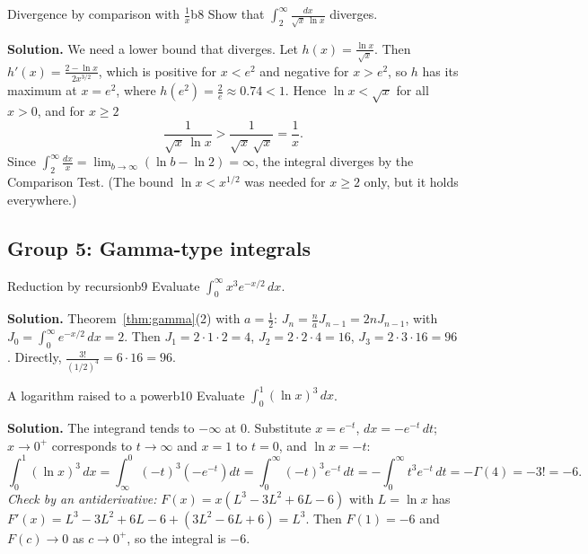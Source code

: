 \documentclass[11pt]{article}
\begin{document}
\begin{exmp}{Divergence by comparison with $\frac1x$}{b8}
Show that $\displaystyle\int_2^\infty\frac{dx}{\sqrt x\,\ln x}$ diverges.

\textbf{Solution.} We need a lower bound that diverges. Let $h(x)=\frac{\ln x}{\sqrt x}$. Then $h'(x)=\frac{2-\ln x}{2x^{3/2}}$, which is positive for $x<e^2$ and negative for $x>e^2$, so $h$ has its maximum at $x=e^2$, where $h(e^2)=\frac2e\approx0.74<1$. Hence $\ln x<\sqrt x$ for all $x>0$, and for $x\ge2$
\[\frac1{\sqrt x\,\ln x}>\frac1{\sqrt x\,\sqrt x}=\frac1x .\]
Since $\int_2^\infty\frac{dx}x=\lim_{b\to\infty}\left(\ln b-\ln2\right)=\infty$, the integral diverges by the Comparison Test. (The bound $\ln x<x^{1/2}$ was needed for $x\ge2$ only, but it holds everywhere.)
\end{exmp}

\subsection*{Group 5: Gamma-type integrals}

\begin{exmp}{Reduction by recursion}{b9}
Evaluate $\displaystyle\int_0^\infty x^3e^{-x/2}\,dx$.

\textbf{Solution.} Theorem~\ref{thm:gamma}(2) with $a=\frac12$: $J_n=\frac naJ_{n-1}=2nJ_{n-1}$, with $J_0=\int_0^\infty e^{-x/2}\,dx=2$. Then $J_1=2\cdot1\cdot2=4$, $J_2=2\cdot2\cdot4=16$, $J_3=2\cdot3\cdot16=96$. Directly, $\frac{3!}{(1/2)^4}=6\cdot16=96$.
\end{exmp}

\begin{exmp}{A logarithm raised to a power}{b10}
Evaluate $\displaystyle\int_0^1(\ln x)^3\,dx$.

\textbf{Solution.} The integrand tends to $-\infty$ at $0$. Substitute $x=e^{-t}$, $dx=-e^{-t}\,dt$; $x\to0^+$ corresponds to $t\to\infty$ and $x=1$ to $t=0$, and $\ln x=-t$:
\[\int_0^1(\ln x)^3\,dx=\int_\infty^0(-t)^3\left(-e^{-t}\right)dt=\int_0^\infty(-t)^3e^{-t}\,dt=-\int_0^\infty t^3e^{-t}\,dt=-\Gamma(4)=-3!=-6 .\]
\emph{Check by an antiderivative:} $F(x)=x\left(L^3-3L^2+6L-6\right)$ with $L=\ln x$ has $F'(x)=L^3-3L^2+6L-6+\left(3L^2-6L+6\right)=L^3$. Then $F(1)=-6$ and $F(c)\to0$ as $c\to0^+$, so the integral is $-6$.
\end{exmp}
\end{document}
